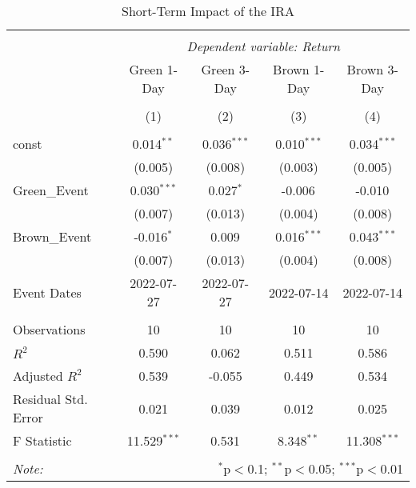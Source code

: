 \begin{table}[!htbp] \centering
  \caption{Short-Term Impact of the IRA}
\begin{tabular}{@{\extracolsep{5pt}}lcccc}
\\[-1.8ex]\hline
\hline \\[-1.8ex]
& \multicolumn{4}{c}{\textit{Dependent variable: Return}} \
\cr \cline{2-5}
\\[-1.8ex] & \multicolumn{1}{c}{Green 1-Day} & \multicolumn{1}{c}{Green 3-Day} & \multicolumn{1}{c}{Brown 1-Day} & \multicolumn{1}{c}{Brown 3-Day}  \\
\\[-1.8ex] & (1) & (2) & (3) & (4) \\
\hline \\[-1.8ex]
 const & 0.014$^{**}$ & 0.036$^{***}$ & 0.010$^{***}$ & 0.034$^{***}$ \\
& (0.005) & (0.008) & (0.003) & (0.005) \\
 Green_Event & 0.030$^{***}$ & 0.027$^{*}$ & -0.006$^{}$ & -0.010$^{}$ \\
& (0.007) & (0.013) & (0.004) & (0.008) \\
 Brown_Event & -0.016$^{*}$ & 0.009$^{}$ & 0.016$^{***}$ & 0.043$^{***}$ \\
& (0.007) & (0.013) & (0.004) & (0.008) \\
 Event Dates & 2022-07-27 & 2022-07-27 & 2022-07-14 & 2022-07-14 \\
\hline \\[-1.8ex]
 Observations & 10 & 10 & 10 & 10 \\
 $R^2$ & 0.590 & 0.062 & 0.511 & 0.586 \\
 Adjusted $R^2$ & 0.539 & -0.055 & 0.449 & 0.534 \\
 Residual Std. Error & 0.021 & 0.039 & 0.012 & 0.025 \\
 F Statistic & 11.529$^{***}$ & 0.531$^{}$ & 8.348$^{**}$ & 11.308$^{***}$ \\
\hline
\hline \\[-1.8ex]
\textit{Note:} & \multicolumn{4}{r}{$^{*}$p$<$0.1; $^{**}$p$<$0.05; $^{***}$p$<$0.01} \\
\end{tabular}
\end{table}